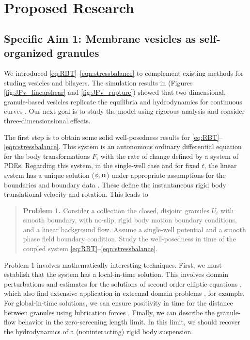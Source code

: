 \section{Proposed Research}
\label{sec:proposed-work}

\subsection{Specific Aim 1: Membrane vesicles as self-organized granules}
\label{sec:specificaim1}
We introduced \eqref{eq:RBT}--\eqref{eqn:stressbalance} to complement
existing methods for studing vesicles and bilayers. 
The simulation results in 
(Figures \ref{fig:JPv_linearshear} and \ref{fig:JPv_rupture})
showed that two-dimensional, granule-based vesicles replicate the 
equilibria and hydrodynamics for continuous curves
\cite{FuQuRyYo22, Fu2018_SIAM}.
Our next goal is to study the model using rigorous analysis
and consider three-dimensionsional effects. 

The first step is to obtain some solid well-posedness results
for \eqref{eq:RBT}--\eqref{eqn:stressbalance}.
This system is an autonomous ordinary differential equation for
the body transformations $F_i$
with the rate of change defined by a system of PDEs.
Regarding this system, in the single-well case and
for fixed $t$, the linear system has a unique solution
($\phi, \mathbf{u}$) 
under appropriate assumptions for the boundaries and boundary data
\cite{manasthesis,rac-gre2016,LAX}.
These define the instantaneous rigid body translational velocity and rotation.
This leads to 
\begin{quotation}
  \textbf{Problem 1.} 
  Consider a collection the closed, disjoint granules
  $U_i$ with smooth boundary, with no-slip, rigid body
  motion boundary conditions, and a linear background flow.
  Assume a single-well potential and a smooth phase field
  boundary condition.  Study the well-posedness in
  time of the coupled system \eqref{eq:RBT}--\eqref{eqn:stressbalance}.
\end{quotation}
Problem 1 involves mathematically interesting techniques.
First, we must establish that the system has a local-in-time solution.
This involves domain perturbations and estimates for the
solutions of second order elliptic equations
\cite{Savar2002DomainPA, DANERS20081, Lamboley2015EstimatesOF},
which also find extensive application in extremal domain problems
\cite{Schiffer1954VariationOD, Henrot2006ExtremumPF,
  bogosel:hal-03607776,Bogosel2022OnTP}, for example.
For global-in-time solutions,
we can ensure positivity in time for the distance between granules
using lubrication forces \cite{cawthorn_balmforth_2010, leal_2007}.
Finally, we can describe the granule-flow
behavior in the zero-screening length limit.
In this limit, we should recover the hydrodynamics of
a (noninteracting) rigid body suspension. 


